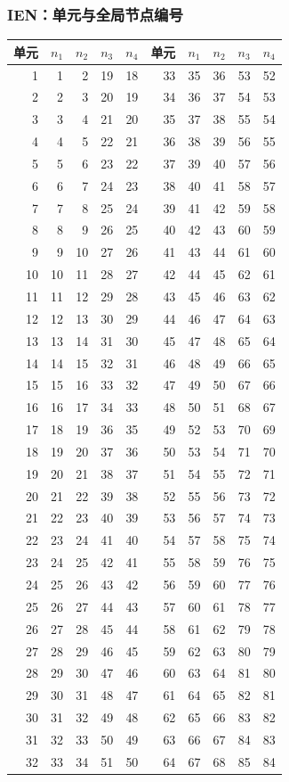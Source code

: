 \subsubsection*{IEN：单元与全局节点编号}
\small\begin{longtable}{rrrrr@{\qquad}rrrrr}
\toprule 单元 & $n_1$ & $n_2$ & $n_3$ & $n_4$ & 单元 & $n_1$ & $n_2$ & $n_3$ & $n_4$ \\ \midrule\endhead
1 & 1 & 2 & 19 & 18 & 33 & 35 & 36 & 53 & 52 \\
2 & 2 & 3 & 20 & 19 & 34 & 36 & 37 & 54 & 53 \\
3 & 3 & 4 & 21 & 20 & 35 & 37 & 38 & 55 & 54 \\
4 & 4 & 5 & 22 & 21 & 36 & 38 & 39 & 56 & 55 \\
5 & 5 & 6 & 23 & 22 & 37 & 39 & 40 & 57 & 56 \\
6 & 6 & 7 & 24 & 23 & 38 & 40 & 41 & 58 & 57 \\
7 & 7 & 8 & 25 & 24 & 39 & 41 & 42 & 59 & 58 \\
8 & 8 & 9 & 26 & 25 & 40 & 42 & 43 & 60 & 59 \\
9 & 9 & 10 & 27 & 26 & 41 & 43 & 44 & 61 & 60 \\
10 & 10 & 11 & 28 & 27 & 42 & 44 & 45 & 62 & 61 \\
11 & 11 & 12 & 29 & 28 & 43 & 45 & 46 & 63 & 62 \\
12 & 12 & 13 & 30 & 29 & 44 & 46 & 47 & 64 & 63 \\
13 & 13 & 14 & 31 & 30 & 45 & 47 & 48 & 65 & 64 \\
14 & 14 & 15 & 32 & 31 & 46 & 48 & 49 & 66 & 65 \\
15 & 15 & 16 & 33 & 32 & 47 & 49 & 50 & 67 & 66 \\
16 & 16 & 17 & 34 & 33 & 48 & 50 & 51 & 68 & 67 \\
17 & 18 & 19 & 36 & 35 & 49 & 52 & 53 & 70 & 69 \\
18 & 19 & 20 & 37 & 36 & 50 & 53 & 54 & 71 & 70 \\
19 & 20 & 21 & 38 & 37 & 51 & 54 & 55 & 72 & 71 \\
20 & 21 & 22 & 39 & 38 & 52 & 55 & 56 & 73 & 72 \\
21 & 22 & 23 & 40 & 39 & 53 & 56 & 57 & 74 & 73 \\
22 & 23 & 24 & 41 & 40 & 54 & 57 & 58 & 75 & 74 \\
23 & 24 & 25 & 42 & 41 & 55 & 58 & 59 & 76 & 75 \\
24 & 25 & 26 & 43 & 42 & 56 & 59 & 60 & 77 & 76 \\
25 & 26 & 27 & 44 & 43 & 57 & 60 & 61 & 78 & 77 \\
26 & 27 & 28 & 45 & 44 & 58 & 61 & 62 & 79 & 78 \\
27 & 28 & 29 & 46 & 45 & 59 & 62 & 63 & 80 & 79 \\
28 & 29 & 30 & 47 & 46 & 60 & 63 & 64 & 81 & 80 \\
29 & 30 & 31 & 48 & 47 & 61 & 64 & 65 & 82 & 81 \\
30 & 31 & 32 & 49 & 48 & 62 & 65 & 66 & 83 & 82 \\
31 & 32 & 33 & 50 & 49 & 63 & 66 & 67 & 84 & 83 \\
32 & 33 & 34 & 51 & 50 & 64 & 67 & 68 & 85 & 84 \\
\bottomrule\end{longtable}\normalsize